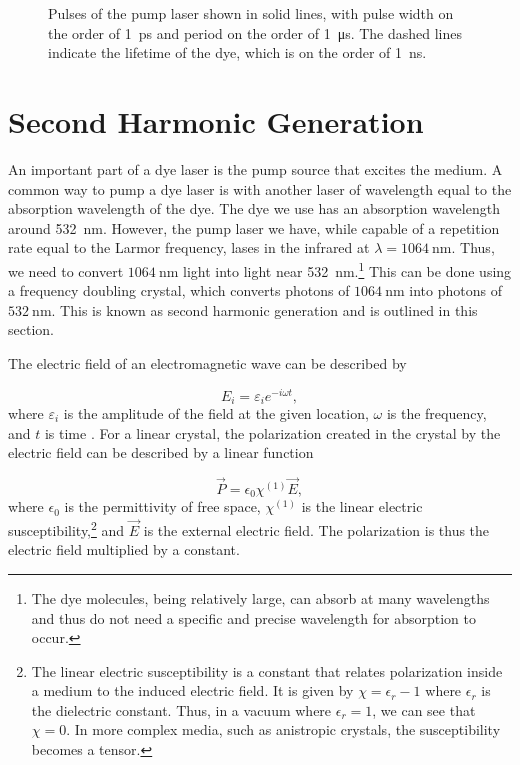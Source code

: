 \begin{figure}[htpb]
	\centering
	
	\caption{Pulses of the pump laser shown in solid lines, with pulse width on the order of \SI{1}{\pico \second} and period on the order of \SI{1}{\micro \second}. The dashed lines indicate the lifetime of the dye, which is on the order of \SI{1}{\nano \second}.}
	\label{fig:tikzpulses}
\end{figure}




\section{Second Harmonic Generation}

An important part of a dye laser is the pump source that excites the medium. A common way to pump a dye laser is with another laser of wavelength equal to the absorption wavelength of the dye. The dye we use has an absorption wavelength around \SI{532}{\nano \meter}. However, the pump laser we have, while capable of a repetition rate equal to the Larmor frequency, lases in the infrared at $\lambda = \SI{1064}{\nano \meter}$. Thus, we need to convert $\SI{1064}{\nano \meter}$ light into light near \SI{532}{\nano \meter}.\footnote{The dye molecules, being relatively large, can absorb at many wavelengths and thus do not need a specific and precise wavelength for absorption to occur.} This can be done using a frequency doubling crystal, which converts photons of $\SI{1064}{\nano \meter}$ into photons of $\SI{532}{\nano \meter}$. This is known as second harmonic generation and is outlined in this section.

The electric field of an electromagnetic wave can be described by

\begin{equation}
  E_i = \varepsilon _i e^{-i\omega t},
  \label{harmonicfield}
\end{equation}
%
where $\varepsilon_i$ is the amplitude of the field at the given location, $\omega$ is the frequency, and $t$ is time \cite{Dood2006}. For a linear crystal, the polarization created in the crystal by the electric field can be described by a linear function

\begin{equation}
  \vec P = \epsilon _0 \chi^{(1)} \vec E,
  \label{linearpolarization}
\end{equation}
%
where $\epsilon_0$ is the permittivity of free space, $\chi^{(1)}$ is the linear electric susceptibility,\footnote{The linear electric susceptibility is a constant that relates polarization inside a medium to the induced electric field. It is given by $\chi = \epsilon_r - 1$ where $\epsilon_r$ is the dielectric constant. Thus, in a vacuum where $\epsilon_r = 1$, we can see that $\chi = 0$. In more complex media, such as anistropic crystals, the susceptibility becomes a tensor.} and $\vec E$ is the external electric field. The polarization is thus the electric field multiplied by a constant.

